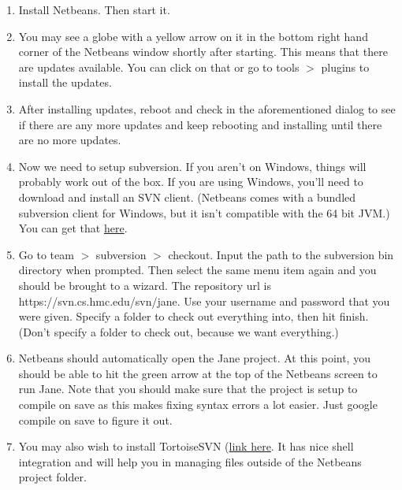 \documentclass{article}
\begin{document}
\begin{enumerate}
\item Install Netbeans. Then start it.

\item You may see a globe with a yellow arrow on it in the bottom right hand corner of the Netbeans window shortly after starting. This means that there are updates available. You can click on that or go to tools $>$ plugins to install the updates.

\item After installing updates, reboot and check in the aforementioned dialog to see if there are any more updates and keep rebooting and installing until there are no more updates.

\item Now we need to setup subversion. If you aren't on Windows, things will probably work out of the box. If you are using Windows, you'll need to download and install an SVN client. (Netbeans comes with a bundled subversion client for Windows, but it isn't compatible with the 64 bit JVM.) You can get that \href{http://www.sliksvn.com/en/download}{here}.

\item Go to team $>$ subversion $>$ checkout. Input the path to the subversion bin directory when prompted. Then select the same menu item again and you should be brought to a wizard. The repository url is https://svn.cs.hmc.edu/svn/jane. Use your username and password that you were given. Specify a folder to check out everything into, then hit finish. (Don't specify a folder to check out, because we want everything.)

\item Netbeans should automatically open the Jane project. At this point, you should be able to hit the green arrow at the top of the Netbeans screen to run Jane. Note that you should make sure that the project is setup to compile on save as this makes fixing syntax errors a lot easier. Just google compile on save to figure it out.

\item You may also wish to install TortoiseSVN (\href{http://tortoisesvn.net/downloads.html}{link here}. It has nice shell integration and will help you in managing files outside of the Netbeans project folder.

\end{enumerate}
\end{document}
